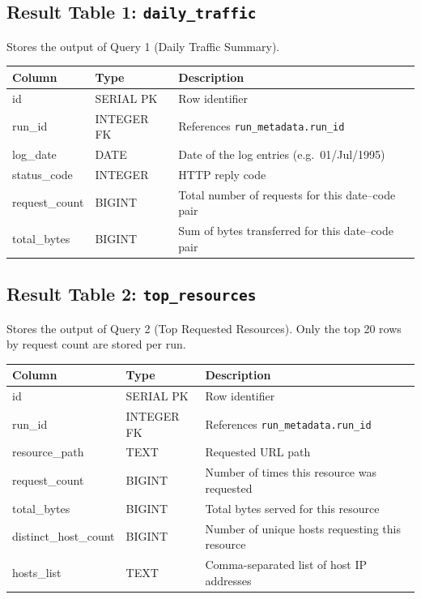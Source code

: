 \documentclass[11pt,a4paper]{article}
\begin{document}
\subsection{Result Table 1: \texttt{daily\_traffic}}

Stores the output of Query 1 (Daily Traffic Summary).

\begin{schematable}
\begin{tabularx}{\linewidth}{@{} >{\ttfamily\small}l >{\small}l X @{}}
\toprule
\textnormal{\textbf{Column}} & \textbf{Type} & \textbf{Description} \\
\midrule
id            & SERIAL PK  & Row identifier \\
run\_id       & INTEGER FK & References \texttt{run\_metadata.run\_id} \\
log\_date     & DATE       & Date of the log entries (e.g.\ 01/Jul/1995) \\
status\_code  & INTEGER    & HTTP reply code \\
request\_count & BIGINT    & Total number of requests for this date--code pair \\
total\_bytes  & BIGINT     & Sum of bytes transferred for this date--code pair \\
\bottomrule
\end{tabularx}
\end{schematable}

\subsection{Result Table 2: \texttt{top\_resources}}

Stores the output of Query 2 (Top Requested Resources). Only the top 20 rows by request count are stored per run.

\begin{schematable}
\begin{tabularx}{\linewidth}{@{} >{\ttfamily\small}l >{\small}l X @{}}
\toprule
\textnormal{\textbf{Column}} & \textbf{Type} & \textbf{Description} \\
\midrule
id                 & SERIAL PK  & Row identifier \\
run\_id            & INTEGER FK & References \texttt{run\_metadata.run\_id} \\
resource\_path     & TEXT       & Requested URL path \\
request\_count     & BIGINT     & Number of times this resource was requested \\
total\_bytes       & BIGINT     & Total bytes served for this resource \\
distinct\_host\_count & BIGINT  & Number of unique hosts requesting this resource \\
hosts\_list        & TEXT       & Comma-separated list of host IP addresses \\
\bottomrule
\end{tabularx}
\end{schematable}
\end{document}

